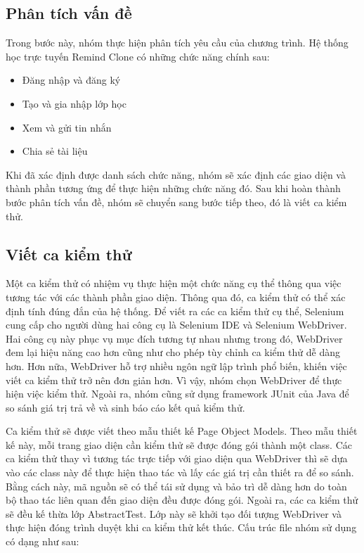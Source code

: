 \documentclass[./../main_file.tex]{subfiles}
\begin{document}
	\subsection{Phân tích vấn đề}
	
	Trong bước này, nhóm thực hiện phân tích yêu cầu của chương trình. Hệ thống học trực tuyến Remind Clone có những chức năng chính sau:
	
	\begin{itemize}
		\item Đăng nhập và đăng ký
		\item Tạo và gia nhập lớp học
		\item Xem và gửi tin nhắn
		\item Chia sẻ tài liệu
	\end{itemize}

	Khi đã xác định được danh sách chức năng, nhóm sẽ xác định các giao diện và thành phần tương ứng để thực hiện những chức năng đó. Sau khi hoàn thành bước phân tích vấn đề, nhóm sẽ chuyển sang bước tiếp theo, đó là viết ca kiểm thử.
	
	\subsection{Viết ca kiểm thử}
	
	Một ca kiểm thử có nhiệm vụ thực hiện một chức năng cụ thể thông qua việc tương tác với các thành phần giao diện. Thông qua đó, ca kiểm thử có thể xác định tính đúng đắn của hệ thống. Để viết ra các ca kiểm thử cụ thể, Selenium cung cấp cho người dùng hai công cụ là Selenium IDE và Selenium WebDriver. Hai công cụ này phục vụ mục đích tương tự nhau nhưng trong đó, WebDriver đem lại hiệu năng cao hơn cũng như cho phép tùy chỉnh ca kiểm thử dễ dàng hơn. Hơn nữa, WebDriver hỗ trợ nhiều ngôn ngữ lập trình phổ biến, khiến việc viết ca kiểm thử trở nên đơn giản hơn. Vì vậy, nhóm chọn WebDriver để thực hiện việc kiểm thử. Ngoài ra, nhóm cũng sử dụng framework JUnit của Java để so sánh giá trị trả về và sinh báo cáo kết quả kiểm thử.
	
	Ca kiểm thử sẽ được viết theo mẫu thiết kế Page Object Models. Theo mẫu thiết kế này, mỗi trang giao diện cần kiểm thử sẽ được đóng gói thành một class. Các ca kiểm thử thay vì tương tác trực tiếp với giao diện qua WebDriver thì sẽ dựa vào các class này để thực hiện thao tác và lấy các giá trị cần thiết ra để so sánh. Bằng cách này, mã nguồn sẽ có thể tái sử dụng và bảo trì dễ dàng hơn do toàn bộ thao tác liên quan đến giao diện đều được đóng gói. Ngoài ra, các ca kiểm thử sẽ đều kế thừa lớp AbstractTest. Lớp này sẽ khởi tạo đối tượng WebDriver và thực hiện đóng trình duyệt khi ca kiểm thử kết thúc. Cấu trúc file nhóm sử dụng có dạng như sau:
	
\end{document}
